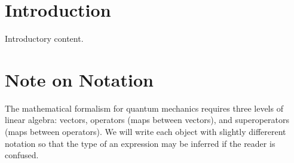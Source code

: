 \chapter*{Introduction}

Introductory content.

\chapter*{Note on Notation}

The mathematical formalism for quantum mechanics requires three levels of linear
algebra: vectors, operators (maps between vectors), and superoperators (maps
between operators). We will write each object with slightly differerent notation
so that the type of an expression may be inferred if the reader is confused.

